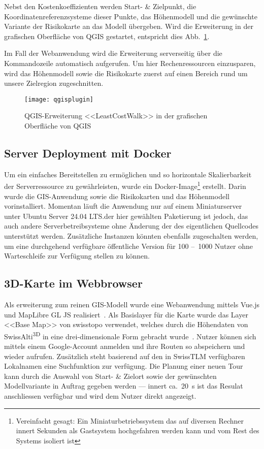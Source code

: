 Nebst den Kostenkoeffizienten werden Start- \& Zielpunkt, die Koordinatenreferenzsysteme dieser Punkte, das Höhenmodell und die gewünschte Variante der Risikokarte an das Modell übergeben. Wird die Erweiterung in der grafischen Oberfläche von QGIS gestartet, entspricht dies Abb.\ \ref{fig:qgisplugin}. 

Im Fall der Webanwendung wird die Erweiterung serverseitig über die Kommandozeile automatisch aufgerufen. Um hier Rechenressourcen einzusparen, wird das Höhenmodell sowie die Risikokarte zuerst auf einen Bereich rund um unsere Zielregion zugeschnitten.

\begin{figure}[H]
  \centering
  \texttt{[image: qgisplugin]}
  \caption{QGIS-Erweiterung <<LeastCostWalk>> in der grafischen Oberfläche von QGIS}\label{fig:qgisplugin}
\end{figure}

\subsection{Server Deployment mit Docker}

Um ein einfaches Bereitstellen zu ermöglichen und so horizontale Skalierbarkeit der Serverressource zu gewährleisten, wurde ein Docker-Image\footnote{Vereinfacht gesagt: Ein Miniaturbetriebssystem das auf diversen Rechner innert Sekunden als Gastsystem hochgefahren werden kann und vom Rest des Systems isoliert ist} erstellt. Darin wurde die GIS-Anwendung sowie die Risikokarten und das Höhenmodell vorinstalliert. Momentan läuft die Anwendung nur auf einem Miniaturserver unter Ubuntu Server 24.04 LTS.\@Vorteil der hier gewählten Paketierung ist jedoch, das auch andere Serverbetreibsysteme ohne Änderung der des eigentlichen Quellcodes unterstützt werden. Zusätzliche Instanzen könnten ebenfalls zugeschalten werden, um eine durchgehend verfügbare öffentliche Version für 100 --~1000 Nutzer ohne Warteschleife zur Verfügung stellen zu können.

\subsection{3D-Karte im Webbrowser}

Als erweiterung zum reinen GIS-Modell wurde eine Webanwendung mittels Vue.js und MapLibre GL JS realisiert~\cite{vuedevman}\cite{maplibregljs}. Als Basislayer für die Karte wurde das Layer <<Base Map>> von swisstopo verwendet, welches durch die Höhendaten von SwissAlti\textsuperscript{3D} in eine drei-dimensionale Form gebracht wurde~\cite{basevtprod}\cite{alti3dprod}. Nutzer können sich mittels einem Google-Account anmelden und ihre Routen so abspeichern und wieder aufrufen. Zusätzlich steht basierend auf den in SwissTLM verfügbaren Lokalnamen eine Suchfunktion zur verfügung. Die Planung einer neuen Tour kann durch die Auswahl von Start- \& Zielort sowie der gewünschten Modellvariante in Auftrag gegeben werden --- innert ca.\ \qty{20}{s} ist das Resulat anschliessen verfügbar und wird dem Nutzer direkt angezeigt.

